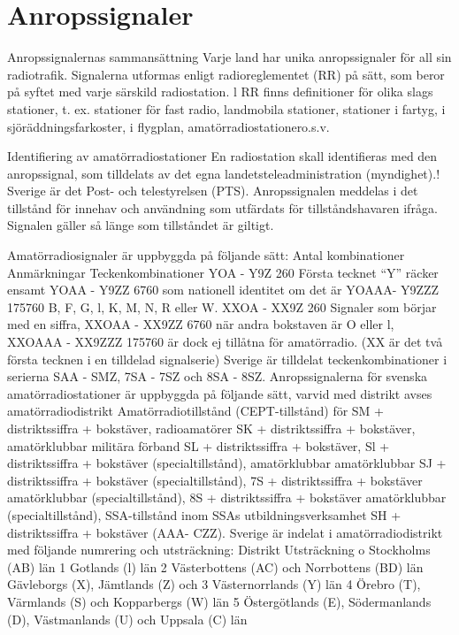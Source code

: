 \section{Anropssignaler}
Anropssignalernas sammansättning
Varje land har unika anropssignaler för all
sin radiotrafik. Signalerna utformas enligt
radioreglementet (RR) på sätt, som beror på
syftet med varje särskild radiostation. l RR
finns definitioner för olika slags stationer,
t. ex. stationer för fast radio, landmobila stationer, stationer i fartyg, i sjöräddningsfarkoster, i flygplan, amatörradiostationero.s.v.

Identifiering av amatörradiostationer
En radiostation skall identifieras med den
anropssignal, som tilldelats av det egna landetsteleadministration (myndighet).! Sverige
är det Post- och telestyrelsen (PTS).
Anropssignalen meddelas i det tillstånd för
innehav och användning som utfärdats för
tillståndshavaren ifråga. Signalen gäller så
länge som tillståndet är giltigt.

Amatörradiosignaler är uppbyggda på följande sätt:
Antal kombinationer Anmärkningar
Teckenkombinationer
YOA - Y9Z
260
Första tecknet ``Y'' räcker ensamt
YOAA - Y9ZZ
6760
som nationell identitet om det är
YOAAA- Y9ZZZ
175760
B, F, G, l, K, M, N, R eller W.
XXOA - XX9Z
260
Signaler som börjar med en siffra,
XXOAA - XX9ZZ
6760
när andra bokstaven är O eller l,
XXOAAA - XX9ZZZ
175760
är dock ej tillåtna för amatörradio.
(XX är det två första tecknen i en tilldelad signalserie)
Sverige är tilldelat teckenkombinationer i serierna SAA - SMZ, 7SA - 7SZ och 8SA - 8SZ.
Anropssignalerna för svenska amatörradiostationer är uppbyggda på följande sätt, varvid
med distrikt avses amatörradiodistrikt
Amatörradiotillstånd (CEPT-tillstånd) för
SM + distriktssiffra + bokstäver,
radioamatörer
SK + distriktssiffra + bokstäver,
amatörklubbar
militära förband
SL + distriktssiffra + bokstäver,
Sl + distriktssiffra + bokstäver
(specialtillstånd),
amatörklubbar
amatörklubbar
SJ + distriktssiffra + bokstäver
(specialtillstånd),
7S + distriktssiffra + bokstäver
amatörklubbar
(specialtillstånd),
8S + distriktssiffra + bokstäver
amatörklubbar
(specialtillstånd),
SSA-tillstånd inom SSAs utbildningsverksamhet
SH + distriktssiffra + bokstäver (AAA- CZZ).
Sverige är indelat i amatörradiodistrikt med följande numrering och utsträckning:
Distrikt Utsträckning
o Stockholms (AB) län
1
Gotlands (l) län
2
Västerbottens (AC) och
Norrbottens (BD) län
Gävleborgs (X), Jämtlands (Z) och
3
Västernorrlands (Y) län
4
Örebro (T), Värmlands (S) och
Kopparbergs (W) län
5
Östergötlands (E), Södermanlands
(D), Västmanlands (U) och Uppsala
(C) län

